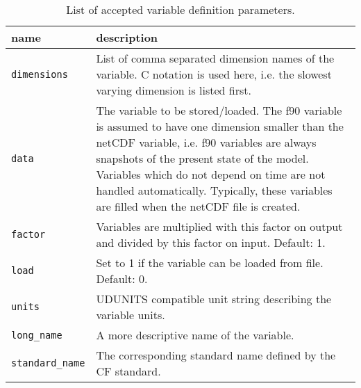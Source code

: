 \begin{table}[htbp]
 \begin{center}
  \begin{tabular}{|l|p{10cm}|}
    \hline
    name & description \\
    \hline
    \hline
    \texttt{dimensions} & List of comma separated dimension names of the variable. C notation is used here, i.e. the slowest varying dimension is listed first.\\
    \hline
    \texttt{data} & The variable to be stored/loaded. The f90 variable is assumed to have one dimension smaller than the netCDF variable, i.e. f90 variables are always snapshots of the present state of the model. Variables which do not depend on time are not handled automatically. Typically, these variables are filled when the netCDF file is created.\\
    \hline
    \texttt{factor} & Variables are multiplied with this factor on output and divided by this factor on input. Default: 1.\\
    \hline
    \texttt{load} & Set to 1 if the variable can be loaded from file. Default: 0.\\
    \hline
    \texttt{units} & UDUNITS compatible unit string describing the variable units.\\
    \hline
    \texttt{long\_name} & A more descriptive name of the variable.\\
    \hline
    \texttt{standard\_name} & The corresponding standard name defined by the CF standard.\\
    \hline
  \end{tabular}
  \caption{List of accepted variable definition parameters.}
  \label{dg.tab.vdf}
 \end{center}
\end{table}
